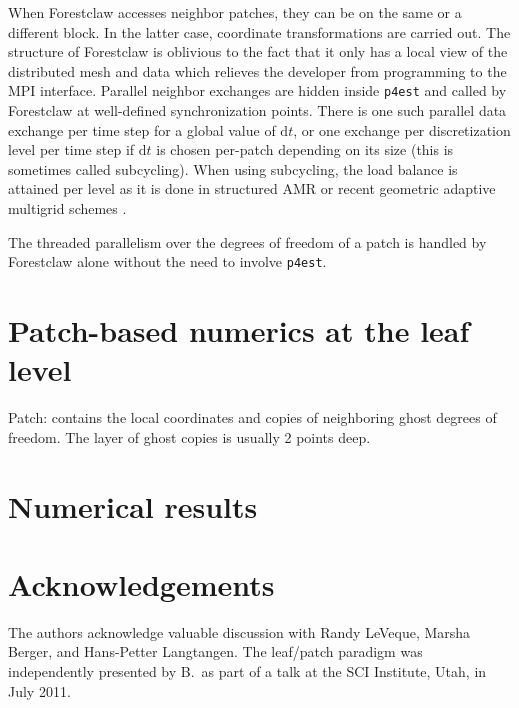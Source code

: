 \documentclass{IOS-Book-Article}     %
\newcommand{\todo}[1]{\textcolor{red}{[TODO: #1]}\xspace}
\newcommand{\dt}{\mathrm{d}t}
\newcommand{\forestclaw}{Forestclaw\xspace}
\newcommand{\pforest}{\texttt{p4est}\xspace}
\begin{document}
When \forestclaw accesses neighbor patches, they can be on the same or a
different block.  In the latter case, coordinate transformations are carried
out.  The structure of \forestclaw is oblivious to the fact that it only has a
local view of the distributed mesh and data which relieves the developer from
programming to the MPI interface.  Parallel neighbor exchanges are hidden
inside \pforest and called by \forestclaw at well-defined synchronization
points.  There is one such parallel data exchange per time step for a global
value of $\dt$, or one exchange per discretization level per time step if $\dt$
is chosen per-patch depending on its size (this is sometimes called
subcycling).  When using subcycling, the load balance is attained per level as
it is done in structured AMR or recent geometric adaptive multigrid schemes
\cite{SundarBirosBursteddeEtAl12}.

The threaded parallelism over the degrees of freedom of a patch is handled by
\forestclaw alone without the need to involve \pforest.






\section{Patch-based numerics at the leaf level}


Patch: contains the local coordinates and copies of neighboring ghost degrees
of freedom.  The layer of ghost copies is usually 2 points deep.


\section{Numerical results}



\section*{Acknowledgements}

The authors acknowledge valuable discussion with Randy LeVeque, Marsha Berger,
and Hans-Petter Langtangen.  The leaf/patch paradigm was independently presented
by B.\ as part of a talk at the SCI Institute, Utah, in July 2011.




\end{document}
